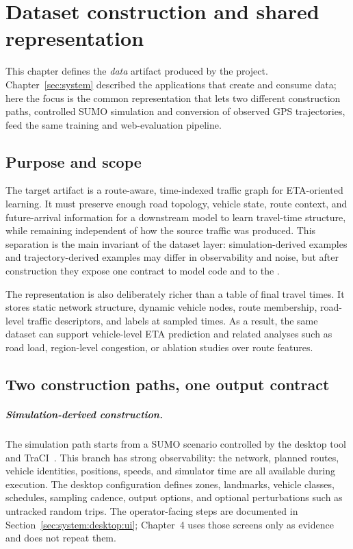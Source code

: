 \chapter{Dataset construction and shared representation}\label{sec:dataset}

This chapter defines the \emph{data} artifact produced by the project. Chapter~\ref{sec:system} described the applications that create and consume data; here the focus is the common representation that lets two different construction paths, controlled SUMO simulation and conversion of observed GPS trajectories, feed the same training and web-evaluation pipeline.

\section{Purpose and scope}
The target artifact is a route-aware, time-indexed traffic graph for ETA-oriented learning. It must preserve enough road topology, vehicle state, route context, and future-arrival information for a downstream model to learn travel-time structure, while remaining independent of how the source traffic was produced. This separation is the main invariant of the dataset layer: simulation-derived examples and trajectory-derived examples may differ in observability and noise, but after construction they expose one contract to model code and to the \WebApp{}.

The representation is also deliberately richer than a table of final travel times. It stores static network structure, dynamic vehicle nodes, route membership, road-level traffic descriptors, and labels at sampled times. As a result, the same dataset can support vehicle-level ETA prediction and related analyses such as road load, region-level congestion, or ablation studies over route features.

\section{Two construction paths, one output contract}
\paragraph{Simulation-derived construction.}
The simulation path starts from a SUMO scenario controlled by the desktop tool and TraCI~\cite{sumo2011,traci2018}. This branch has strong observability: the network, planned routes, vehicle identities, positions, speeds, and simulator time are all available during execution. The desktop configuration defines zones, landmarks, vehicle classes, schedules, sampling cadence, output options, and optional perturbations such as untracked random trips. The operator-facing steps are documented in Section~\ref{sec:system:desktop:ui}; Chapter~4 uses those screens only as evidence and does not repeat them.


